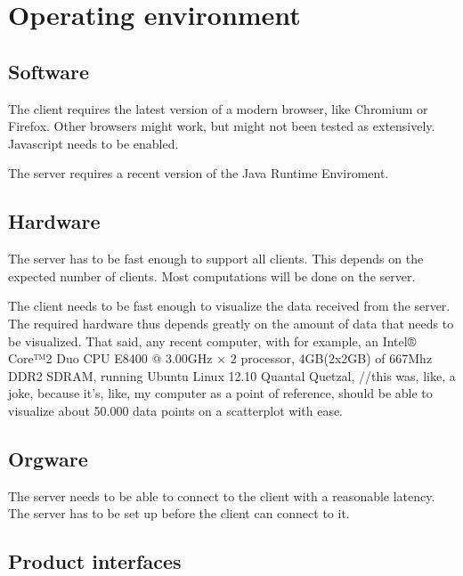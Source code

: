 \section{Operating environment}


\subsection{Software}
The client requires the latest version of a modern browser, like Chromium or Firefox. Other browsers might work, but might not been tested as extensively.
Javascript needs to be enabled.

The server requires a recent version of the Java Runtime Enviroment.


\subsection{Hardware}

The server has to be fast enough to support all clients. This depends on the expected number of clients. Most computations will be done on the server.

The client needs to be fast enough to visualize the data received from the server. The required hardware thus depends greatly on the amount of data that needs to be visualized. That said, any recent computer, with for example, an Intel® Core™2 Duo CPU E8400 @ 3.00GHz × 2 processor, 4GB(2x2GB) of 667Mhz DDR2 SDRAM, running Ubuntu Linux 12.10 Quantal Quetzal, //this was, like, a joke, because it's, like, my computer
 as a point of reference, should be able to visualize about 50.000 data points on a scatterplot with ease.


\subsection{Orgware}

The server needs to be able to connect to the client with a reasonable latency.
The server has to be set up before the client can connect to it.

\subsection{Product interfaces}
